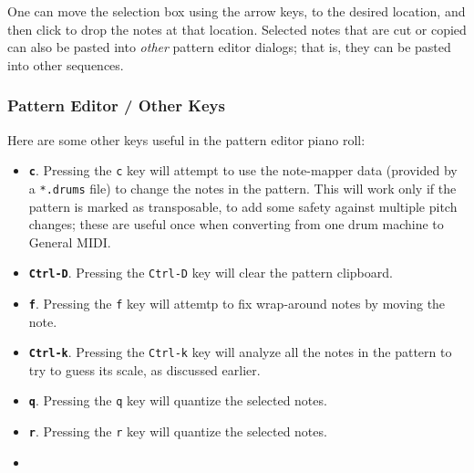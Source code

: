    One can move the selection box using the arrow keys, to the
   desired location, and then click to
   drop the notes at that location.
   Selected notes that are cut or copied can also be
   pasted into \textsl{other} pattern editor dialogs; that is, they can be
   pasted into other sequences.

\subsubsection{Pattern Editor / Other Keys}
\label{subsubsec:pattern_editor_other_keys}

   Here are some other keys useful in the pattern editor piano roll:

   \begin{itemize}
      \item
         \textbf{\texttt{c}}.
         Pressing the \texttt{c} key will attempt to use the note-mapper data
         (provided by a \texttt{*.drums} file) to change the notes in the
         pattern.  This will work only if the pattern is marked as transposable,
         to add some safety against multiple pitch changes; these are useful once
         when converting from one drum machine to General MIDI.
      \item
         \textbf{\texttt{Ctrl-D}}.
         Pressing the \texttt{Ctrl-D} key will clear the pattern clipboard.
      \item
         \textbf{\texttt{f}}.
         Pressing the \texttt{f} key will attemtp to fix wrap-around notes by
         moving the note.
      \item
         \textbf{\texttt{Ctrl-k}}.
         Pressing the \texttt{Ctrl-k} key will analyze all the notes in the
         pattern to try to guess its scale, as discussed earlier.
      \item
         \textbf{\texttt{q}}.
         Pressing the \texttt{q} key will quantize the selected notes.
      \item
         \textbf{\texttt{r}}.
         Pressing the \texttt{r} key will quantize the selected notes.
      \item

\end{itemize}
